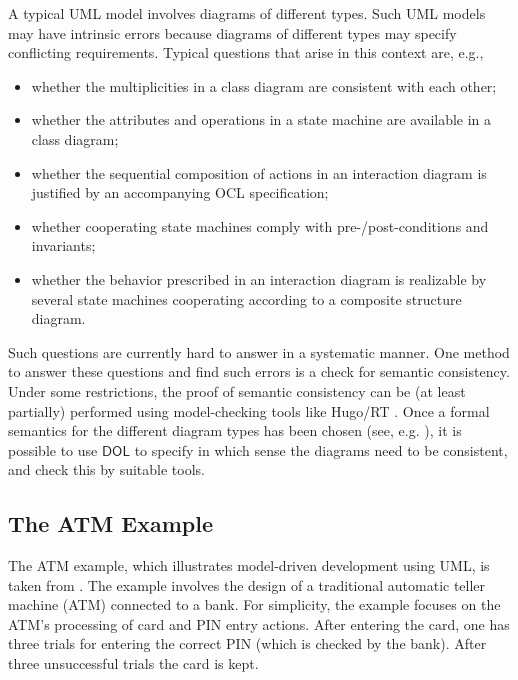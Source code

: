 \documentclass[10pt,fleqn,final]{scrreprt}
\newcommand{\cbs}[0]{\color{red}\xspace} %
\newcommand{\cbe}[0]{\color{black}\xspace} %
\newcommand*{\DOL}{\ensuremath{\mathsf{DOL}}\xspace}
\newcommand{\ssclause}[1]{\subsection{#1}}
\newenvironment{definitions}[0]{\medskip }{}
\begin{document}
\begin{definitions}
A typical UML model involves diagrams of different types. Such UML models may have intrinsic errors because diagrams of different types may specify conflicting 
requirements. Typical questions that arise in this context are, e.g.,

\begin{itemize}
\item whether the multiplicities in a class diagram are consistent with each other;
\item whether the attributes and operations in a state machine are
available in a class diagram;
\item	  whether the sequential composition of actions in an interaction diagram is justified by an accompanying OCL specification;
\item 	whether cooperating state machines comply with pre-/post-conditions and invariants;
\item 	whether the behavior prescribed in an interaction diagram is realizable by several state machines cooperating according to a composite structure diagram.
\end{itemize}
Such questions are currently hard to answer in a systematic manner. One method to answer these questions and find such errors is a check for semantic 
consistency. Under some restrictions, the proof of semantic consistency can be (at least partially) performed using model-checking tools like Hugo/RT \cite{knapp-wuttke:models06wsh:2007}. 
Once a formal semantics for the different diagram types has been chosen (see, e.g. \cite{knapp-mossakowski-roggenbach:corr:2014}), it is possible to use \DOL to specify in which 
sense the diagrams need to be consistent, and check this by suitable tools.


\ssclause{The ATM Example}
\label{sec:atm-example}

\cbs The ATM example, which illustrates model-driven development using UML,
is taken from \cite{knapp-mossakowski-roggenbach:corr:2014}.  The example involves\cbe
the design of a traditional automatic teller machine (ATM) connected
to a bank. For simplicity, \cbs the example focuses
 on the ATM's processing of card and PIN entry actions.\cbe  
After entering the card, one has three
trials for entering the correct PIN (which is checked by the
bank). After three unsuccessful trials the card is kept.


\end{definitions}
\end{document}

